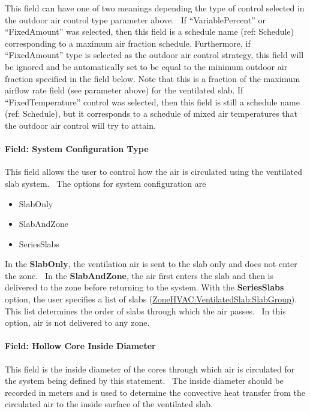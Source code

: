 This field can have one of two meanings depending the type of control selected in the outdoor air control type parameter above.~ If ``VariablePercent'' or ``FixedAmount'' was selected, then this field is a schedule name (ref: Schedule) corresponding to a maximum air fraction schedule. Furthermore, if ``FixedAmount'' type is selected as the outdoor air control strategy, this field will be ignored and be automatically set to be equal to the minimum outdoor air fraction specified in the field below. Note that this is a fraction of the maximum airflow rate field (see parameter above) for the ventilated slab. If ``FixedTemperature'' control was selected, then this field is still a schedule name (ref: Schedule), but it corresponds to a schedule of mixed air temperatures that the outdoor air control will try to attain.

\paragraph{Field: System Configuration Type}\label{field-system-configuration-type}

This field allows the user to control how the air is circulated using the ventilated slab system.~ The options for system configuration are

\begin{itemize}
\item
  SlabOnly
\item
  SlabAndZone
\item
  SeriesSlabs
\end{itemize}

In the \textbf{SlabOnly}, the ventilation air is sent to the slab only and does not enter the zone.~ In the \textbf{SlabAndZone}, the air first enters the slab and then is delivered to the zone before returning to the system. With the \textbf{SeriesSlabs} option, the user specifies a list of slabs (\hyperref[zonehvacventilatedslabslabgroup]{ZoneHVAC:VentilatedSlab:SlabGroup}). This list determines the order of slabs through which the air passes.~ In this option, air is not delivered to any zone.

\paragraph{Field: Hollow Core Inside Diameter}\label{field-hollow-core-inside-diameter}

This field is the inside diameter of the cores through which air is circulated for the system being defined by this statement.~ The inside diameter should be recorded in meters and is used to determine the convective heat transfer from the circulated air to the inside surface of the ventilated slab.

